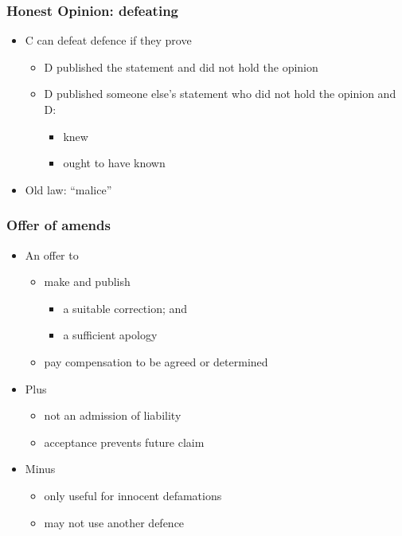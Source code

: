 \documentclass[ignorenonframetext,]{beamer}
\begin{document}
\begin{frame}
  \frametitle{Honest Opinion: defeating}
  \begin{itemize}
  \item C can defeat defence if they prove
    \begin{itemize}
    \item D published the statement and did not hold the opinion
    \item D published someone else's statement who did not hold the opinion and D:
      \begin{itemize}
      \item knew
      \item ought to have known
      \end{itemize}
    \end{itemize}
  \item Old law: ``malice''
  \end{itemize}

\end{frame}

\begin{frame}
\frametitle{Offer of amends}

\begin{itemize}
\item  An offer to

  \begin{itemize}
  \item    make and publish

    \begin{itemize}
    \item a suitable correction; and
    \item a sufficient apology
    \end{itemize}
  \item    {pay }{compensation to be agreed or determined}
  \end{itemize}
\item  {Plus}

  \begin{itemize}
  \item    {not an admission of liability}
  \item    {acceptance prevents future claim}
  \end{itemize}
\item  {Minus}

  \begin{itemize}
  \item    {only useful for innocent defamations}
  \item    {may not use another defence}
  \end{itemize}
\end{itemize}

\end{frame}
\end{document}

